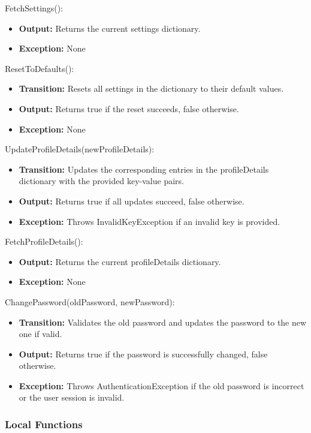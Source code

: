 \documentclass[12pt, titlepage]{article}
\begin{document}
\noindent FetchSettings():
\begin{itemize}
  \item \textbf{Output:} Returns the current settings dictionary.
  \item \textbf{Exception:} None
\end{itemize}

\noindent ResetToDefaults():
\begin{itemize}
  \item \textbf{Transition:} Resets all settings in the dictionary to their default values.
  \item \textbf{Output:} Returns true if the reset succeeds, false otherwise.
  \item \textbf{Exception:} None
\end{itemize}

\noindent UpdateProfileDetails(newProfileDetails):
\begin{itemize}
  \item \textbf{Transition:} Updates the corresponding entries in the profileDetails dictionary with the provided key-value pairs.
  \item \textbf{Output:} Returns true if all updates succeed, false otherwise.
  \item \textbf{Exception:} Throws InvalidKeyException if an invalid key is provided.
\end{itemize}

\noindent FetchProfileDetails():
\begin{itemize}
  \item \textbf{Output:} Returns the current profileDetails dictionary.
  \item \textbf{Exception:} None
\end{itemize}

\noindent ChangePassword(oldPassword, newPassword):
\begin{itemize}
  \item \textbf{Transition:} Validates the old password and updates the password to the new one if valid.
  \item \textbf{Output:} Returns true if the password is successfully changed, false otherwise.
  \item \textbf{Exception:} Throws AuthenticationException if the old password is incorrect or the user session is invalid.
\end{itemize}

\subsubsection{Local Functions}
\end{document}
